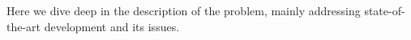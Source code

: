 Here we dive deep in the description of the problem, mainly addressing state-of-the-art development and its issues.